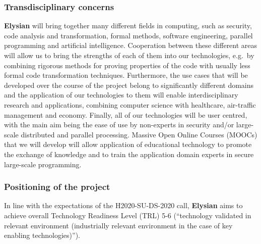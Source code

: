 \documentclass[a4paper,11pt]{article}
\newcommand{\project}[1]{\textbf{#1}\xspace}
\newcommand{\SECURITY}{\project{Elysian}}
\newcommand{\TheProject}{\SECURITY}
\begin{document}

\subsubsection*{Transdisciplinary concerns}
\TheProject{} will bring together many different fields in computing, such as security, code analysis and transformation, formal methods, software engineering, parallel programming and artificial intelligence. Cooperation between these different areas will allow us to bring the strengths of each of them into our technologies, e.g.~by combining rigorous methods for proving properties of the code with usually less formal code transformation techniques. Furthermore, the use cases that will be developed over the course of the project belong to significantly different domains and the application of our technologies to them will enable interdisciplinary research and applications, combining computer science with healthcare, air-traffic management and economy. Finally, all of our technologies will be user centred, with the main aim being the ease of use by non-experts in security and/or large-scale distributed and parallel processing. Massive Open Online Courses (MOOCs) that we will develop will allow application of educational technology to promote the exchange of knowledge and to train the application domain experts in secure large-scale programming. 

\subsubsection{Positioning of the project}

In line with the expectations of the H2020-SU-DS-2020 call, \TheProject{} aims
to achieve overall Technology Readiness Level (TRL) 5-6 (``technology
validated in relevant environment (industrially relevant environment in
the case of key enabling technologies)'').
\end{document}
